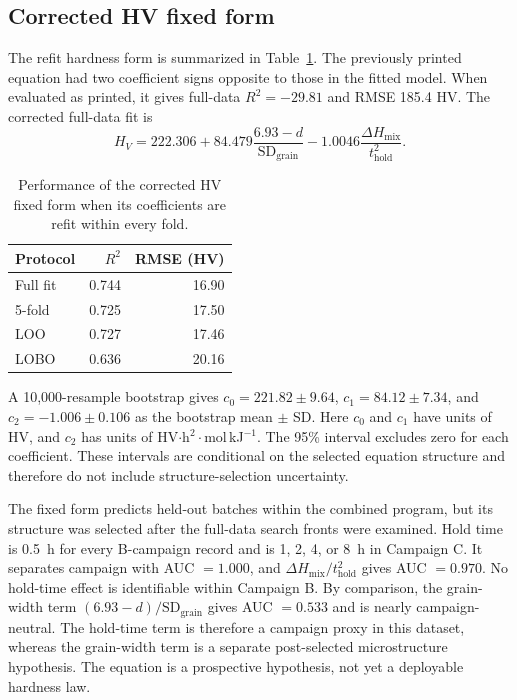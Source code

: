 \documentclass[a4paper,11pt]{article}
\begin{document}
\subsection{Corrected HV fixed form}

The refit hardness form is summarized in Table~\ref{tab:hvfixed}. The previously printed equation had two coefficient signs opposite to those in the fitted model. When evaluated as printed, it gives full-data $R^2=-29.81$ and RMSE 185.4 HV. The corrected full-data fit is
\begin{equation}
H_V=222.306+84.479\frac{6.93-d}{\mathrm{SD}_{\mathrm{grain}}}
-1.0046\frac{\Delta H_{\mathrm{mix}}}{t_{\mathrm{hold}}^2}.
\end{equation}

\begin{table}[H]
\centering
\caption{Performance of the corrected HV fixed form when its coefficients are refit within every fold.}
\label{tab:hvfixed}
\begin{tabular}{lrr}
\toprule
Protocol & $R^2$ & RMSE (HV) \\
\midrule
Full fit & 0.744 & 16.90 \\
5-fold & 0.725 & 17.50 \\
LOO & 0.727 & 17.46 \\
LOBO & 0.636 & 20.16 \\
\bottomrule
\end{tabular}
\end{table}

A 10,000-resample bootstrap gives $c_0=221.82\pm9.64$, $c_1=84.12\pm7.34$, and $c_2=-1.006\pm0.106$ as the bootstrap mean $\pm$ SD. Here $c_0$ and $c_1$ have units of HV, and $c_2$ has units of HV$\cdot$h$^2\cdot$mol\,kJ$^{-1}$. The 95\% interval excludes zero for each coefficient. These intervals are conditional on the selected equation structure and therefore do not include structure-selection uncertainty.

The fixed form predicts held-out batches within the combined program, but its structure was selected after the full-data search fronts were examined. Hold time is 0.5~h for every B-campaign record and is 1, 2, 4, or 8~h in Campaign C. It separates campaign with AUC $=1.000$, and $\Delta H_{\mathrm{mix}}/t_{\mathrm{hold}}^2$ gives AUC $=0.970$. No hold-time effect is identifiable within Campaign B. By comparison, the grain-width term $(6.93-d)/\mathrm{SD}_{\mathrm{grain}}$ gives AUC $=0.533$ and is nearly campaign-neutral. The hold-time term is therefore a campaign proxy in this dataset, whereas the grain-width term is a separate post-selected microstructure hypothesis. The equation is a prospective hypothesis, not yet a deployable hardness law.
\end{document}
